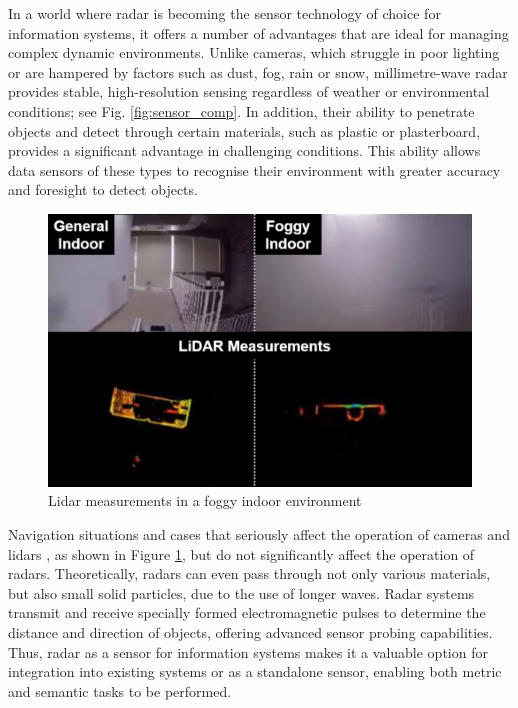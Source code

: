 In a world where radar is becoming the sensor technology of choice for information systems, it offers a number of advantages that are ideal for managing complex dynamic environments. Unlike cameras, which struggle in poor lighting or are hampered by factors such as dust, fog, rain or snow, millimetre-wave radar provides stable, high-resolution sensing regardless of weather or environmental conditions; see Fig. \ref{fig:sensor_comp}. In addition, their ability to penetrate objects and detect through certain materials, such as plastic or plasterboard, provides a significant advantage in challenging conditions. This ability allows data sensors of these types to recognise their environment with greater accuracy and foresight to detect objects.



\begin{figure}[H]
    \centering
    \includegraphics[width=0.75\linewidth]{Src/images/x1.png} 
    \caption{Lidar measurements in a foggy indoor environment \citep{harlow2021mmwave}}
    \label{fig:lidarfogy}
\end{figure}


Navigation situations and cases that seriously affect the operation of cameras \citep{starr2013navigation} and lidars \citep{Skolnik2001}, as shown in Figure \ref{fig:lidarfogy}, but do not significantly affect the operation of radars. Theoretically, radars can even pass through not only various materials, but also small solid particles, due to the use of longer waves.
Radar systems transmit and receive specially formed electromagnetic pulses to determine the distance and direction of objects, offering advanced sensor probing capabilities. Thus, radar as a sensor for information systems makes it a valuable option for integration into existing systems or as a standalone sensor, enabling both metric and semantic tasks to be performed.






